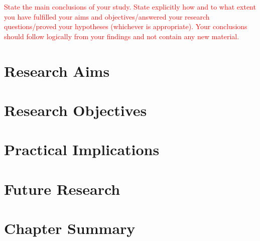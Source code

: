 \textcolor{red}{State the main conclusions of your study. State explicitly how and to what extent you have fulfilled your aims and objectives/answered your research questions/proved your hypotheses (whichever is appropriate). Your conclusions should follow logically from your findings and not contain any new material.}

\section{Research Aims}


\lipsum


\section{Research Objectives}


\lipsum


\section{Practical Implications}


\lipsum


\section{Future Research}


\lipsum


\section{Chapter Summary}


\lipsum

